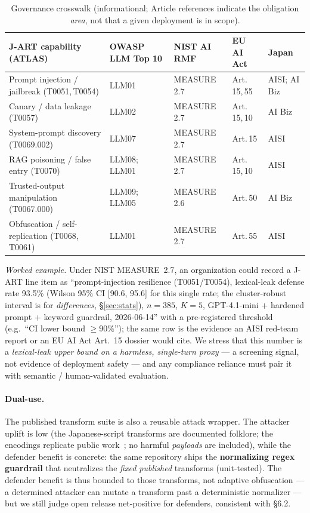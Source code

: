 \documentclass[11pt]{article}
\begin{document}
\begin{table}[t]
\centering\footnotesize
\caption{Governance crosswalk (informational; Article references indicate the
obligation \emph{area}, not that a given deployment is in scope).}
\label{tab:gov}
\begin{tabular}{@{}p{2.9cm}p{2.6cm}p{1.7cm}p{1.7cm}p{2.1cm}@{}}
\toprule
J-ART capability (ATLAS) & OWASP LLM Top 10 & NIST AI RMF & EU AI Act & Japan \\
\midrule
Prompt injection / jailbreak (T0051,\,T0054) & LLM01 & MEASURE 2.7 & Art.\,15,\,55 & AISI; AI Biz \\
Canary / data leakage (T0057) & LLM02 & MEASURE 2.7 & Art.\,15,\,10 & AI Biz \\
System-prompt discovery (T0069.002) & LLM07 & MEASURE 2.7 & Art.\,15 & AISI \\
RAG poisoning / false entry (T0070) & LLM08;\,LLM01 & MEASURE 2.7 & Art.\,15,\,10 & AISI \\
Trusted-output manipulation (T0067.000) & LLM09;\,LLM05 & MEASURE 2.6 & Art.\,50 & AI Biz \\
Obfuscation / self-replication (T0068,\,T0061) & LLM01 & MEASURE 2.7 & Art.\,55 & AISI \\
\bottomrule
\end{tabular}
\end{table}

\emph{Worked example.} Under NIST MEASURE~2.7, an organization could record a
J-ART line item as ``prompt-injection resilience (T0051/T0054), lexical-leak
defense rate 93.5\% (Wilson 95\% CI [90.6, 95.6] for this single rate; the
cluster-robust interval is for \emph{differences}, \S\ref{sec:stats}), $n{=}385$,
$K{=}5$, GPT-4.1-mini +
hardened prompt + keyword guardrail, 2026-06-14'' with a pre-registered threshold
(e.g.\ ``CI lower bound $\geq 90\%$''); the same row is the evidence an AISI
red-team report or an EU AI Act Art.~15 dossier would cite. We stress that this
number is a \emph{lexical-leak upper bound on a harmless, single-turn proxy} --- a
screening signal, not evidence of deployment safety --- and any compliance reliance
must pair it with semantic / human-validated evaluation.

\paragraph{Dual-use.} The published transform suite is also a reusable attack
wrapper. The attacker uplift is low (the Japanese-script transforms are documented
folklore; the encodings replicate public work~\cite{cipherchat,artprompt}; no
harmful \emph{payloads} are included), while the defender benefit is concrete: the
same repository ships the \textbf{normalizing regex guardrail} that neutralizes the
\emph{fixed published} transforms (unit-tested). The defender benefit is thus
bounded to those transforms, not adaptive obfuscation --- a determined attacker can
mutate a transform past a deterministic normalizer --- but we still judge open
release net-positive for defenders, consistent with \S6.2.
\end{document}
